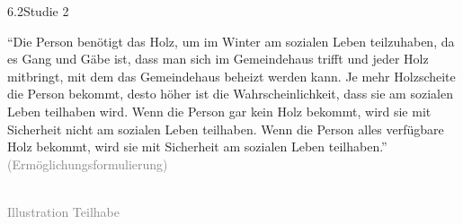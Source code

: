 \documentclass[xcolor=table,9pt,aspectratio=169]{beamer}
\begin{document}
\begin{frame}{\vspace*{10mm}6.2\hspace*{1em}Studie 2}
\begin{multicols}{2}
   \enquote{Die Person benötigt das Holz, um im Winter am sozialen Leben teilzuhaben, da es Gang und Gäbe ist, dass man sich im Gemeindehaus trifft und jeder Holz mitbringt, mit dem das Gemeindehaus beheizt werden kann. Je mehr Holzscheite die Person bekommt, desto höher ist die Wahrscheinlichkeit, dass sie am sozialen Leben teilhaben wird. Wenn die Person gar kein Holz bekommt, wird sie mit Sicherheit nicht am sozialen Leben teilhaben. Wenn die Person alles verfügbare Holz bekommt, wird sie mit Sicherheit am sozialen Leben teilhaben.}\\
   \medskip
   \textcolor{gray}{(Ermöglichungsformulierung)}
   \vfill
   \begin{center}
      \\
      \footnotesize{\textcolor{gray}{Illustration Teilhabe}}
   \end{center}
\end{multicols}
\end{frame}
\end{document}
